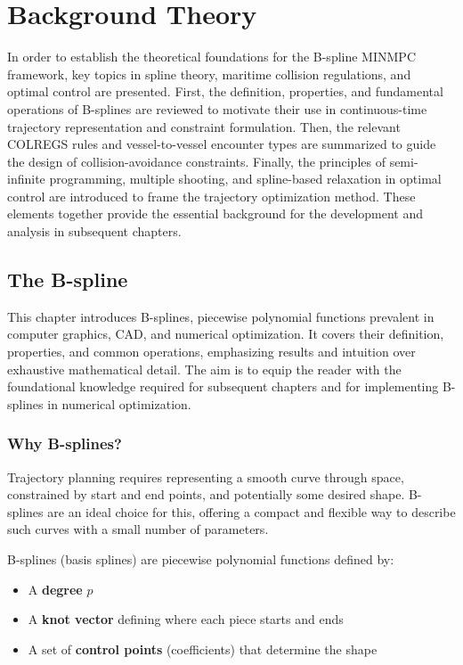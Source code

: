 
\chapter{Background Theory}\label{chap:background-theory}
In order to establish the theoretical foundations for the B-spline MINMPC framework, key topics in spline theory, maritime collision regulations, and optimal control are presented. First, the definition, properties, and fundamental operations of B-splines are reviewed to motivate their use in continuous-time trajectory representation and constraint formulation. Then, the relevant COLREGS rules and vessel-to-vessel encounter types are summarized to guide the design of collision-avoidance constraints. Finally, the principles of semi-infinite programming, multiple shooting, and spline-based relaxation in optimal control are introduced to frame the trajectory optimization method. These elements together provide the essential background for the development and analysis in subsequent chapters.



\section{The B-spline}
\label{sec:b-spline-theory}
This chapter introduces B-splines, piecewise polynomial functions prevalent in computer graphics, CAD, and numerical optimization. It covers their definition, properties, and common operations, emphasizing results and intuition over exhaustive mathematical detail. The aim is to equip the reader with the foundational knowledge required for subsequent chapters and for implementing B-splines in numerical optimization.


\subsection{Why B-splines?}

Trajectory planning requires representing a smooth curve through space, constrained by start and end points, and potentially some desired shape. B-splines are an ideal choice for this, offering a compact and flexible way to describe such curves with a small number of parameters.

B-splines (basis splines) are piecewise polynomial functions defined by:
\begin{itemize}
    \item A \textbf{degree} \( p \)
    \item A \textbf{knot vector} defining where each piece starts and ends
    \item A set of \textbf{control points} (coefficients) that determine the shape
\end{itemize}

